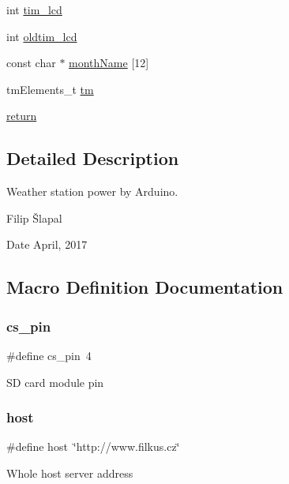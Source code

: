\begin{DoxyCompactItemize}
\item 
int \hyperlink{_w_s_8ino_aafe10273424e4ce6028423ddf348cd58}{tim\+\_\+lcd}
\item 
int \hyperlink{_w_s_8ino_a1e3b4218dc8a4352253c9648cf72433d}{oldtim\+\_\+lcd}
\item 
const char $\ast$ \hyperlink{_w_s_8ino_a9fce7af8b9842b4ab3b85327b1af13fc}{month\+Name} \mbox{[}12\mbox{]}
\item 
tm\+Elements\+\_\+t \hyperlink{_w_s_8ino_a52357cbf68af66972047f7aed7a45218}{tm}
\item 
\hyperlink{_w_s_8ino_a9717e7bbecb906637e86cef6da3d83c2}{return}
\end{DoxyCompactItemize}


\subsection{Detailed Description}
Weather station power by Arduino. 

Filip Šlapal \begin{DoxyDate}{Date}
April, 2017 
\end{DoxyDate}


\subsection{Macro Definition Documentation}
\mbox{\label{_w_s_8ino_ad7860cb7dbe49e4f2ebde8c624b448ef}} 
\subsubsection{\texorpdfstring{cs\+\_\+pin}{cs\_pin}}
{\footnotesize\ttfamily \#define cs\+\_\+pin~4}

SD card module pin \mbox{\label{_w_s_8ino_ad9949162675c2cb74b115f5dfb224732}} 
\subsubsection{\texorpdfstring{host}{host}}
{\footnotesize\ttfamily \#define host~\char`\"{}http\+://www.\+filkus.\+cz\char`\"{}}

Whole host server address \mbox{\label{_w_s_8ino_a9e2e38c07417ce7edf45d45a5a6b92c9}} 
